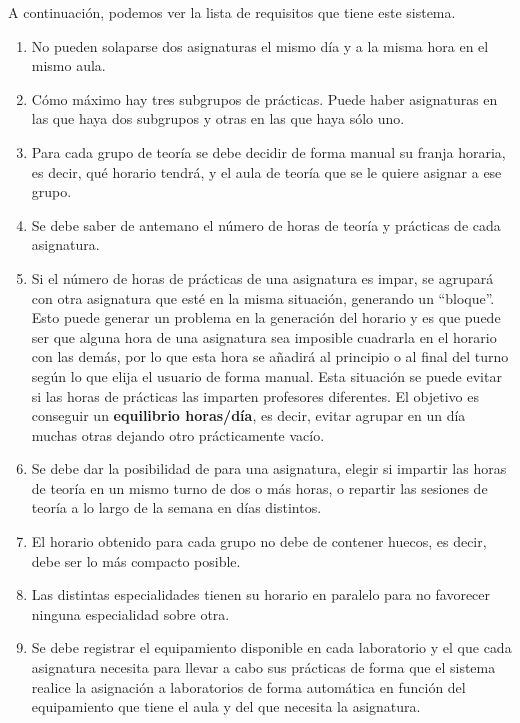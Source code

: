 A continuación, podemos ver la lista de requisitos que tiene este sistema.

\begin{enumerate}[REQ-1]
    \item No pueden solaparse dos asignaturas el mismo día y a la misma hora en el mismo aula.
    \item Cómo máximo hay tres subgrupos de prácticas. Puede haber asignaturas en las que haya dos subgrupos y otras en las que haya sólo uno.
    \item Para cada grupo de teoría se debe decidir de forma manual su franja horaria, es decir, qué horario tendrá, y el aula de teoría que se le quiere asignar a ese grupo.
    \item Se debe saber de antemano el número de horas de teoría y prácticas de cada asignatura.
    \item Si el número de horas de prácticas de una asignatura es impar, se agrupará con otra asignatura que esté en la misma situación, generando un ``bloque''. Esto puede generar un problema en la generación del horario y es que puede ser que alguna hora de una asignatura sea imposible cuadrarla en el horario con las demás, por lo que esta hora se añadirá al principio o al final del turno según lo que elija el usuario de forma manual. Esta situación se puede evitar si las horas de prácticas las imparten profesores diferentes. El objetivo es conseguir un \textbf{equilibrio horas/día}, es decir, evitar agrupar en un día muchas otras dejando otro prácticamente vacío. 
    \item Se debe dar la posibilidad de para una asignatura, elegir si impartir las horas de teoría en un mismo turno de dos o más horas, o repartir las sesiones de teoría a lo largo de la semana en días distintos.
    \item El horario obtenido para cada grupo no debe de contener huecos, es decir, debe ser lo más compacto posible.
    \item Las distintas especialidades tienen su horario en paralelo para no favorecer ninguna especialidad sobre otra. 
    \item Se debe registrar el equipamiento disponible en cada laboratorio y el que cada asignatura necesita para llevar a cabo sus prácticas de forma que el sistema realice la asignación a laboratorios de forma automática en función del equipamiento que tiene el aula y del que necesita la asignatura. 

\end{enumerate}

